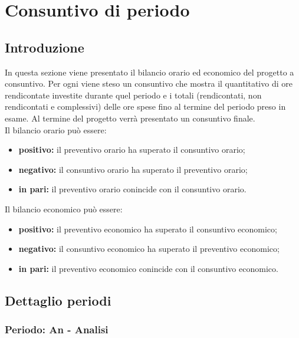 
\section {Consuntivo di periodo}
	\subsection {Introduzione}
	In questa sezione viene presentato il bilancio orario ed economico del progetto a consuntivo. Per ogni  viene steso un consuntivo che mostra il quantitativo di ore rendicontate investite durante quel periodo e i totali (rendicontati, non rendicontati e complessivi) delle ore spese fino al termine del periodo preso in esame. Al termine del progetto verrà presentato un consuntivo finale.
	\\Il bilancio orario può essere:
	\begin{itemize}
	\item \textbf{positivo:} il preventivo orario ha superato il consuntivo orario;
	\item \textbf{negativo:} il consuntivo orario ha superato il preventivo orario;
	\item \textbf{in pari:} il preventivo orario conincide con il consuntivo orario.
	\end{itemize}
	Il bilancio economico può essere:
	\begin{itemize}
	\item \textbf{positivo:} il preventivo economico ha superato il consuntivo economico;
	\item \textbf{negativo:} il consuntivo economico ha superato il preventivo economico;
	\item \textbf{in pari:}  il preventivo economico conincide con il consuntivo economico.
	\end{itemize}
	
	\newpage
	\subsection {Dettaglio periodi}
		\subsubsection {Periodo: An - Analisi}
